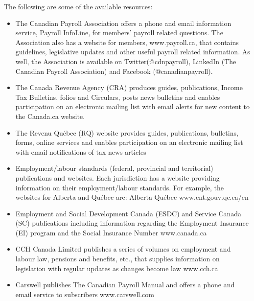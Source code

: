 \documentclass[letterpaper,10pt,english]{sphinxmanual}
\begin{document}
\sphinxAtStartPar
The following are some of the available resources:
\begin{itemize}
\item {} 
\sphinxAtStartPar
The Canadian Payroll Association offers a phone and email information service, Payroll InfoLine, for members’ payroll related questions. The Association also has a website for members, www.payroll.ca, that contains guidelines, legislative updates and other useful payroll related information. As well, the Association is available on Twitter(@cdnpayroll), LinkedIn (The Canadian Payroll Association) and Facebook (@canadianpayroll).

\item {} 
\sphinxAtStartPar
The Canada Revenue Agency (CRA) produces guides, publications, Income Tax Bulletins, folios and Circulars, posts news bulletins and enables participation on an electronic mailing list with e\sphinxhyphen{}mail alerts for new content to the Canada.ca website.

\item {} 
\sphinxAtStartPar
The Revenu Québec (RQ) website provides guides, publications, bulletins, forms, online services and enables participation on an electronic mailing list with e\sphinxhyphen{}mail notifications of tax news articles \sphinxhyphen{} 

\item {} 
\sphinxAtStartPar
Employment/labour standards (federal, provincial and territorial) publications and websites. Each jurisdiction has a website providing information on their employment/labour standards. For example, the websites for Alberta and Québec are: Alberta \sphinxhyphen{}  Québec \sphinxhyphen{} www.cnt.gouv.qc.ca/en

\item {} 
\sphinxAtStartPar
Employment and Social Development Canada (ESDC) and Service Canada (SC) publications including information regarding the Employment Insurance (EI) program and the Social Insurance Number \sphinxhyphen{} www.canada.ca

\item {} 
\sphinxAtStartPar
CCH Canada Limited publishes a series of volumes on employment and labour law, pensions and benefits, etc., that supplies information on legislation with regular updates as changes become law \sphinxhyphen{} www.cch.ca

\item {} 
\sphinxAtStartPar
Carswell publishes The Canadian Payroll Manual and offers a phone and email service to subscribers \sphinxhyphen{} www.carswell.com

\end{itemize}
\end{document}
